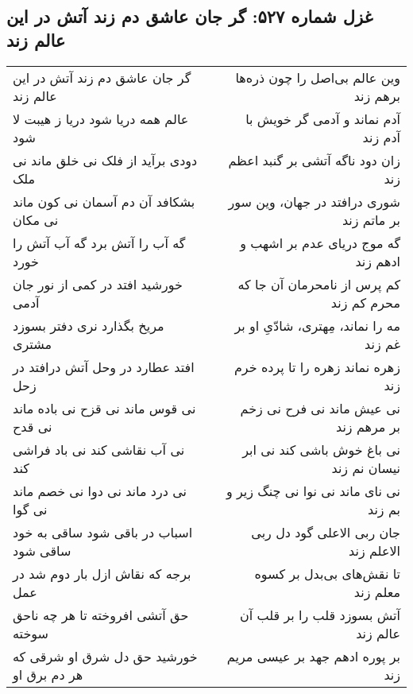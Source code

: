 \begin{center}
\section*{غزل شماره ۵۲۷: گر جان عاشق دم زند آتش در این عالم زند}
\label{sec:0527}
\begin{longtable}{l p{0.5cm} r}
گر جان عاشق دم زند آتش در این عالم زند
&&
وین عالم بی‌اصل را چون ذره‌ها برهم زند
\\
عالم همه دریا شود دریا ز هیبت لا شود
&&
آدم نماند و آدمی گر خویش با آدم زند
\\
دودی برآید از فلک نی خلق ماند نی ملک
&&
زان دود ناگه آتشی بر گنبد اعظم زند
\\
بشکافد آن دم آسمان نی کون ماند نی مکان
&&
شوری درافتد در جهان، وین سور بر ماتم زند
\\
گه آب را آتش برد گه آب آتش را خورد
&&
گه موج دریای عدم بر اشهب و ادهم زند
\\
خورشید افتد در کمی از نور جان آدمی
&&
کم پرس از نامحرمان آن جا که محرم کم زند
\\
مریخ بگذارد نری دفتر بسوزد مشتری
&&
مه را نماند، مِهتری، شادّیِ او بر غم زند
\\
افتد عطارد در وحل آتش درافتد در زحل
&&
زهره نماند زهره را تا پرده خرم زند
\\
نی قوس ماند نی قزح نی باده ماند نی قدح
&&
نی عیش ماند نی فرح نی زخم بر مرهم زند
\\
نی آب نقاشی کند نی باد فراشی کند
&&
نی باغ خوش باشی کند نی ابر نیسان نم زند
\\
نی درد ماند نی دوا نی خصم ماند نی گوا
&&
نی نای ماند نی نوا نی چنگ زیر و بم زند
\\
اسباب در باقی شود ساقی به خود ساقی شود
&&
جان ربی الاعلی گود دل ربی الاعلم زند
\\
برجه که نقاش ازل بار دوم شد در عمل
&&
تا نقش‌های بی‌بدل بر کسوه معلم زند
\\
حق آتشی افروخته تا هر چه ناحق سوخته
&&
آتش بسوزد قلب را بر قلب آن عالم زند
\\
خورشید حق دل شرق او شرقی که هر دم برق او
&&
بر پوره ادهم جهد بر عیسی مریم زند
\\
\end{longtable}
\end{center}
